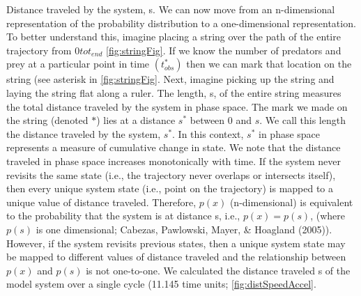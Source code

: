 \documentclass[12pt,twoside,openany]{reedthesis}
\begin{document}
Distance traveled by the system, s. We can now move from an
n-dimensional representation of the probability distribution to a
one-dimensional representation. To better understand this, imagine
placing a string over the path of the entire trajectory from
\(0 to t_{end}\) \ref{fig:stringFig}. If we know the number of predators
and prey at a particular point in time \((t_{obs}^*)\) then we can mark
that location on the string (see asterisk in \ref{fig:stringFig}. Next,
imagine picking up the string and laying the string flat along a ruler.
The length, s, of the entire string measures the total distance traveled
by the system in phase space. The mark we made on the string (denoted
\(*\)) lies at a distance \(s^*\) between 0 and \(s\). We call this
length the distance traveled by the system, \(s^*\). In this context,
\(s^*\) in phase space represents a measure of cumulative change in
state. We note that the distance traveled in phase space increases
monotonically with time. If the system never revisits the same state
(i.e., the trajectory never overlaps or intersects itself), then every
unique system state (i.e., point on the trajectory) is mapped to a
unique value of distance traveled. Therefore, \(p(x)\) (n-dimensional)
is equivalent to the probability that the system is at distance s, i.e.,
\(p(x)=p(s)\), (where \(p(s)\) is one dimensional; Cabezas, Pawlowski,
Mayer, \& Hoagland (2005)). However, if the system revisits previous
states, then a unique system state may be mapped to different values of
distance traveled and the relationship between \(p(x)\) and \(p(s)\) is
not one-to-one. We calculated the distance traveled s of the model
system over a single cycle (11.145 time units; \ref{fig:distSpeedAccel}.
\end{document}
